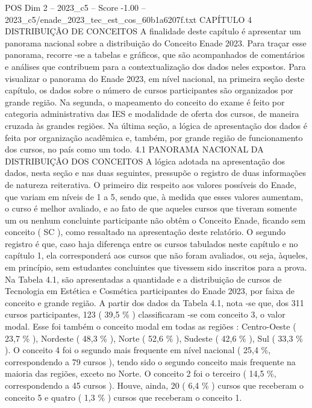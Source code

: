 \begin{textsample}{POS Dim 2 – 2023\_c5 – Score -1.00 – 2023\_c5/enade\_2023\_tec\_est\_cos\_60b1a6207f.txt}  \label{ex:f2_pos_258}
CAPÍTULO 4 DISTRIBUIÇÃO DE CONCEITOS A finalidade deste capítulo é apresentar um panorama nacional sobre a distribuição do Conceito Enade 2023.
Para traçar esse panorama, recorre -se a tabelas e gráficos, que são acompanhados de comentários e análises que contribuem para a contextualização dos dados neles expostos.
Para visualizar o panorama do Enade 2023, em nível nacional, na primeira seção deste capítulo, os dados sobre o número de cursos participantes são organizados por grande região.
Na segunda, o mapeamento do conceito do exame é feito por categoria administrativa das IES e modalidade de oferta dos cursos, de maneira cruzada às grandes regiões.
Na última seção, a lógica de apresentação dos dados é feita por organização acadêmica e, também, por grande região de funcionamento dos cursos, no país como um todo. 4.1 PANORAMA NACIONAL DA DISTRIBUIÇÃO DOS CONCEITOS A lógica adotada na apresentação dos dados, nesta seção e nas duas seguintes, pressupõe o registro de duas informações de natureza reiterativa.
O primeiro diz respeito aos valores possíveis do Enade, que variam em níveis de 1 a 5, sendo que, à medida que esses valores aumentam, o curso é melhor avaliado, e ao fato de que aqueles cursos que tiveram somente um ou nenhum concluinte participante não obtêm o Conceito Enade, ficando sem conceito ( SC ), como ressaltado na apresentação deste relatório.
O segundo registro é que, caso haja diferença entre os cursos tabulados neste capítulo e no capítulo 1, ela corresponderá aos cursos que não foram avaliados, ou seja, àqueles, em princípio, sem estudantes concluintes que tivessem sido inscritos para a prova.
Na Tabela 4.1, são apresentadas a quantidade e a distribuição de cursos de Tecnologia em Estética e Cosmética participantes do Enade 2023, por faixa de conceito e grande região.
A partir dos dados da Tabela 4.1, nota -se que, dos 311 cursos participantes, 123 ( 39,5 \% ) classificaram -se com conceito 3, o valor modal.
Esse foi também o conceito modal em todas as regiões : Centro-Oeste ( 23,7 \% ), Nordeste ( 48,3 \% ), Norte ( 52,6 \% ), Sudeste ( 42,6 \% ), Sul ( 33,3 \% ).
O conceito 4 foi o segundo mais frequente em nível nacional ( 25,4 \%, correspondendo a 79 cursos ), tendo sido o segundo conceito mais frequente na maioria das regiões, exceto no Norte.
O conceito 2 foi o terceiro ( 14,5 \%, correspondendo a 45 cursos ).
Houve, ainda, 20 ( 6,4 \% ) cursos que receberam o conceito 5 e quatro ( 1,3 \% ) cursos que receberam o conceito 1.

\end{textsample}
